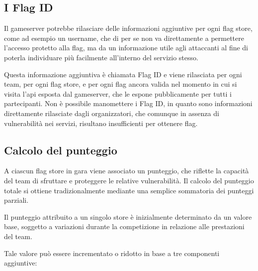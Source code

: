 \subsection{I Flag ID}

Il gameserver potrebbe rilasciare delle informazioni aggiuntive per ogni flag store, come ad esempio un username, che di per se non va direttamente a permettere l'accesso protetto alla flag, ma da un informazione utile agli attaccanti al fine di poterla individuare più facilmente all'interno del servizio stesso.

Questa informazione aggiuntiva è chiamata Flag ID e viene rilasciata per ogni team, per ogni flag store, e per ogni flag ancora valida nel momento in cui si visita l'\gls{api} esposta dal gameserver, che le espone pubblicamente per tutti i partecipanti. Non è possibile manomettere i Flag ID, in quanto sono informazioni direttamente rilasciate dagli organizzatori, che comunque in assenza di vulnerabilità nei servizi, risultano insufficienti per ottenere flag.

\subsection{Calcolo del punteggio}

A ciascun flag store in gara viene associato un punteggio, che riflette la capacità del team di sfruttare e proteggere le relative vulnerabilità. Il calcolo del punteggio totale si ottiene tradizionalmente mediante una semplice sommatoria dei punteggi parziali.

Il punteggio attribuito a un singolo store è inizialmente determinato da un valore base, soggetto a variazioni durante la competizione in relazione alle prestazioni del team.

Tale valore può essere incrementato o ridotto in base a tre componenti aggiuntive:

